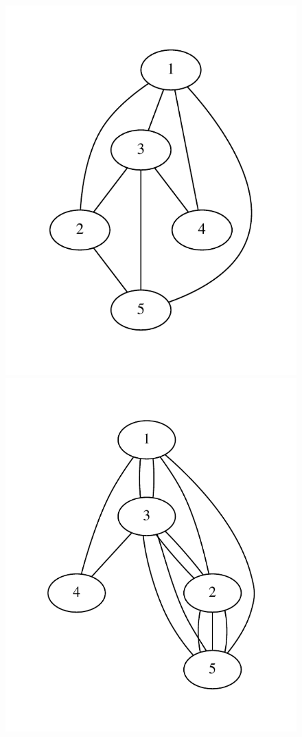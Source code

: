 \documentclass[12 pt]{article}
\begin{document}
\begin{figure}[H]
	\centering
	\includegraphics[scale=0.7]{single_example}\includegraphics[scale=0.7]{multi_example}

\end{figure}
\end{document}
